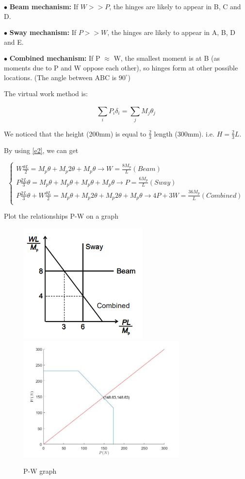 $\bullet$ \textbf{Beam mechanism:} If $W>>P$, the hinges are likely to appear in B, C and D.



$\bullet$ \textbf{Sway mechanism:} If $P>>W$, the hinges are likely to appear in A, B, D and E.




$\bullet$ \textbf{Combined mechanism:} If P $\approx$ W, the smallest moment
is at B (as moments due to P
and W oppose each other), so
hinges form at other possible
locations. (The angle between ABC is $90^\circ$)

The virtual work method is: 

\begin{equation}
    \sum_i^{}{P_i\delta_i}=\sum_j^{}{M_j\theta_j}
    \label{e2}
\end{equation}

We noticed that the height (200mm) is equal to $\frac{2}{3}$ length (300mm). i.e. $H=\frac{2}{3}L$.

By using \autoref{e2}, we can get

$$
\left\{ \begin{array}{l}
	W\frac{\theta L}{2}=M_p\theta+M_p2\theta+M_p\theta \rightarrow W=\frac{8M_p}{L} (Beam)\\
	P\frac{2L}{3}\theta=M_p\theta+M_p\theta+M_p\theta+M_p\theta \rightarrow P=\frac{6M_p}{L} (Sway)\\
	P\frac{2L}{3}\theta+W\frac{\theta L}{2}=M_p\theta+M_p2\theta+M_p2\theta+M_p\theta \rightarrow 4P+3W=\frac{36M_p}{L} (Combined)\\
\end{array} \right. 
$$

Plot the relationships P-W on a graph

\begin{figure}[htbp]
    \centering
    \includegraphics[width=6.5cm]{./fig/14.png}
    \includegraphics[width=8.5cm]{./fig/15.jpg}
    \caption{P-W graph}
    \label{f3}
\end{figure}



